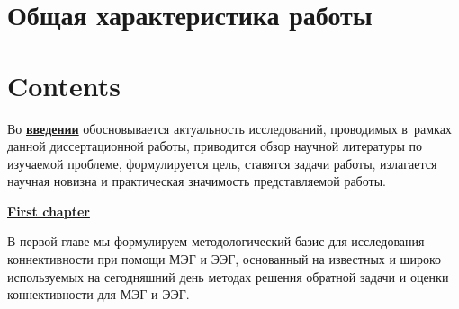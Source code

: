 
\section*{Общая характеристика работы}

\newcommand{\actuality}{\underline{\textbf{\actualityTXT}}}
\newcommand{\progress}{\underline{\textbf{\progressTXT}}}
\newcommand{\aim}{\underline{{\textbf\aimTXT}}}
\newcommand{\tasks}{\underline{\textbf{\tasksTXT}}}
\newcommand{\novelty}{\underline{\textbf{\noveltyTXT}}}
\newcommand{\influence}{\underline{\textbf{\influenceTXT}}}
\newcommand{\methods}{\underline{\textbf{\methodsTXT}}}
\newcommand{\defpositions}{\underline{\textbf{\defpositionsTXT}}}
\newcommand{\reliability}{\underline{\textbf{\reliabilityTXT}}}
\newcommand{\probation}{\underline{\textbf{\probationTXT}}}
\newcommand{\contribution}{\underline{\textbf{\contributionTXT}}}
\newcommand{\publications}{\underline{\textbf{\publicationsTXT}}}




\section*{Contents}
Во \underline{\textbf{введении}} обосновывается актуальность
исследований, проводимых в~рамках данной диссертационной работы,
приводится обзор научной литературы по изучаемой проблеме,
формулируется цель, ставятся задачи работы, излагается научная новизна
и практическая значимость представляемой работы.


\underline{\textbf{First chapter}}

В первой главе мы формулируем методологический базис для исследования коннективности
при помощи МЭГ и ЭЭГ, основанный на известных и широко используемых на сегодняшний
день методах решения обратной задачи и оценки коннективности для МЭГ и ЭЭГ.

